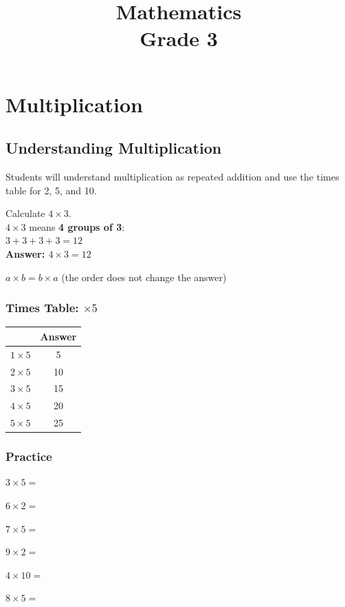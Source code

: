 \documentclass{math_textbook}
\begin{document}
\frontmatter
\title{\Huge\bfseries\color{GradeMain}Mathematics\\[6pt]\large Grade 3}
\author{}
\date{}
\maketitle
\tableofcontents

\mainmatter

\chapter{Multiplication}

\section{Understanding Multiplication}

\begin{learningobjective}
Students will understand multiplication as repeated addition and use the times table for 2, 5, and 10.
\end{learningobjective}

\begin{workedexample}
Calculate $4 \times 3$.\\[6pt]
$4 \times 3$ means \textbf{4 groups of 3}:\\[4pt]
$3 + 3 + 3 + 3 = 12$\\[4pt]
\textbf{Answer: $4 \times 3 = 12$}
\end{workedexample}

\begin{remember}
$a \times b = b \times a$ \quad (the order does not change the answer)
\end{remember}

\subsection*{Times Table: $\times 5$}
\begin{center}
\begin{tabular}{|c|c|}
\hline
\rowcolor{GradePale}
\textbf{} & \textbf{Answer}\\
\hline
$1 \times 5$ & 5\\
$2 \times 5$ & 10\\
$3 \times 5$ & 15\\
$4 \times 5$ & 20\\
$5 \times 5$ & 25\\
\hline
\end{tabular}
\end{center}

\subsection*{Practice}
\begin{practicegrid}
  \item $3 \times 5 =$ \blank
  \item $6 \times 2 =$ \blank
  \item $7 \times 5 =$ \blank
  \item $9 \times 2 =$ \blank
  \item $4 \times 10 =$ \blank
  \item $8 \times 5 =$ \blank
\end{practicegrid}
\end{document}
